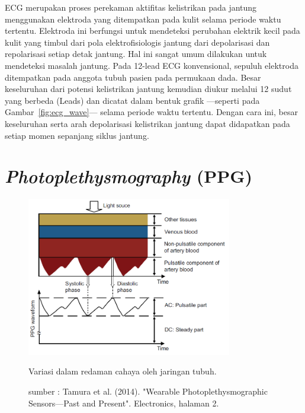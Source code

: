 ECG merupakan proses perekaman aktifitas kelistrikan pada jantung menggunakan elektroda yang ditempatkan pada kulit selama periode waktu tertentu. Elektroda ini berfungsi untuk mendeteksi perubahan elektrik kecil pada kulit yang timbul dari pola elektrofisiologis jantung dari depolarisasi dan repolarisasi setiap detak jantung. Hal ini sangat umum dilakukan untuk mendeteksi masalah jantung.
Pada 12-lead ECG konvensional, sepuluh elektroda ditempatkan pada anggota tubuh pasien pada permukaan dada. Besar keseluruhan dari potensi kelistrikan jantung kemudian diukur melalui 12 sudut yang berbeda (Leads) dan dicatat dalam bentuk grafik ---seperti pada Gambar~\ref{fig:ecg_wave}--- selama periode waktu tertentu. Dengan cara ini, besar keseluruhan serta arah depolarisasi kelistrikan jantung dapat didapatkan pada setiap momen sepanjang siklus jantung.



\section{\textit{Photoplethysmography} (PPG)}

\begin{figure}[ht]
	\centering
	\includegraphics[width=0.8\textwidth]{ppg}
	\caption{Variasi dalam redaman cahaya oleh jaringan tubuh.}
	\caption*{sumber : Tamura et al. (2014). "Wearable Photoplethysmographic Sensors—Past and Present". Electronics, halaman 2.}
	\label{fig:ppg}   
\end{figure}

